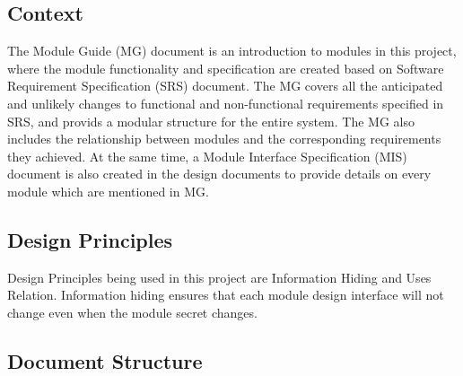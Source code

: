 \documentclass[12,english]{article}
\begin{document}
	\subsection{Context}
	The Module Guide (MG) document is an introduction to modules in this project, where the module functionality and specification are created based on Software Requirement Specification (SRS) document. The MG covers all the anticipated and unlikely changes to functional and non-functional requirements specified in SRS, and provids a modular structure for the entire system. The MG also includes the relationship between modules and the corresponding requirements they achieved. At the same time, a Module Interface Specification (MIS) document is also created in the design documents to provide details on every module which are mentioned in MG. 

	\subsection{Design Principles}
	Design Principles being used in this project are Information Hiding and Uses Relation. Information hiding ensures that each module design interface will not change even when the module secret changes.
	

	\subsection{Document Structure}
	
\end{document}
